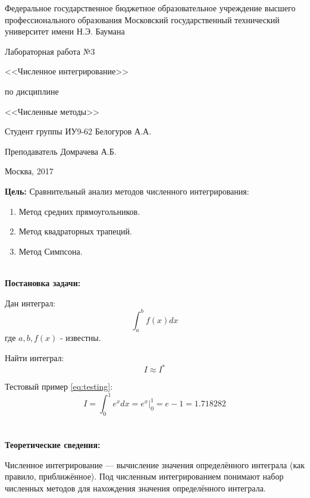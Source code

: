 \documentclass[a4paper, 12pt]{article}   	%
\begin{document}
\begin{titlepage}

\thispagestyle{empty}

\begin{center}
Федеральное государственное бюджетное образовательное учреждение высшего профессионального образования Московский государственный технический университет имени Н.Э. Баумана
\end{center}


\vfill

\centerline{\large{Лабораторная работа №3}}
\centerline{\large{<<Численное интегрирование>>}}
\centerline{\large{по дисциплине}}
\centerline{\large{<<Численные методы>>}}

\vfill

Студент группы ИУ9-62 \hfill Белогуров А.А.

Преподаватель \hfill Домрачева А.Б.
\vfill

\centerline{Москва, 2017}
\clearpage
\end{titlepage}

\newpage
\setcounter{page}{2}

\textbf{Цель:}
Сравнительный анализ методов численного интегрирования: 
\begin{enumerate}
\item Метод средних прямоугольников.
\item Метод квадраторных трапеций.
\item Метод Симпсона.
\\\\
\end{enumerate}


 
 \textbf{Постановка задачи:}
 
 Дан интеграл:
 $$\int_{a}^{b} f(x)dx$$где $a, b, f(x)$ - известны.
 
 Найти интеграл:
 $$I \approx I^* $$
 
 Тестовый пример \eqref{eq:testing}:
 \begin{equation}\label{eq:testing}
 I = \int_{0}^{1} e^x dx = e^x \Big|_{0}^{1} = e - 1 = 1.718282
 \end{equation}
\\\\

\textbf{Теоретические сведения:}

Численное интегрирование — вычисление значения определённого интеграла (как правило, приближённое). Под численным интегрированием понимают набор численных методов для нахождения значения определённого интеграла.
\end{document}
